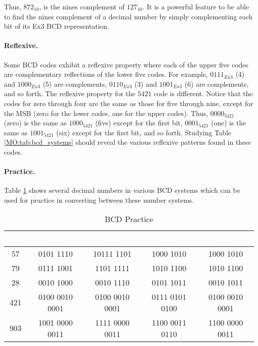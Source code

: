 Thus, $ 872_{10} $, is the nines complement of $ 127_{10} $. It is a powerful feature to be able to find the nines complement of a decimal number by simply complementing each bit of its Ex3 \ac{BCD} representation. 

\paragraph{Reflexive.} Some \ac{BCD} codes exhibit a reflexive property where each of the upper five codes are complementary reflections of the lower five codes. For example, $ 0111_{Ex3} $ (4) and $ 1000_{Ex3} $ (5) are complements, $ 0110_{Ex3} $ (3) and $ 1001_{Ex3} $ (6) are complements, and so forth. The reflexive property for the $ 5421 $ code is different. Notice that the codes for zero through four are the same as those for five through nine, except for the \ac{MSB} (zero for the lower codes, one for the upper codes). Thus, $ 0000_{5421} $ (zero) is the same as $ 1000_{5421} $ (five) except for the first bit, $ 0001_{5421} $ (one) is the same as $ 1001_{5421} $ (six) except for the first bit, and so forth. Studying Table \ref{MO:tab:bcd_systems} should reveal the various reflexive patterns found in these codes.

\paragraph{Practice.} Table \ref{MO:tab:bcd_practice} shows several decimal numbers in various \ac{BCD} systems which can be used for practice in converting between these number systems.

\begin{table}[H]
  \sffamily
  \newcommand{\head}[1]{\textcolor{white}{\textbf{#1}}}    
  \begin{center}
    {\small         
      \begin{tabular}{ c c c c c } 
        \hline
        \rowcolor{black!75}
        {\head{Dec}} & {\head{8421}} & \head{2421} 
        & \head{Ex3} & \head{5421} \\
        \hline    
        57  & 0101 1110      & 10111 1101     
            & 1000 1010      & 1000 1010 \\
        79  & 0111 1001      & 1101 1111      
            & 1010 1100      & 1010 1100 \\
        
        28  & 0010 1000      & 0010 1110      
            & 0101 1011      & 0010 1011 \\
        421 & 0100 0010 0001 & 0100 0010 0001 
            & 0111 0101 0100 & 0100 0010 0001 \\
        
        903 & 1001 0000 0011 & 1111 0000 0011 
            & 1100 0011 0110 & 1100 0000 0011 \\
        \hline  
      \end{tabular}
    }  %
  \end{center}
  \caption{BCD Practice}
  \label{MO:tab:bcd_practice}
\end{table}

